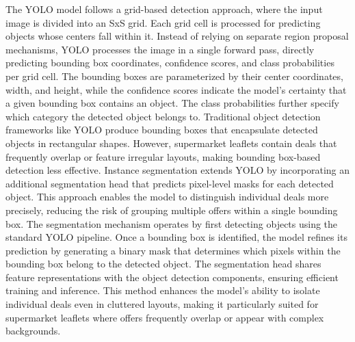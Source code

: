 \documentclass[11pt]{article}
\begin{document}
The YOLO model follows a grid-based detection approach, where the input image is divided into an SxS grid. Each grid cell is processed for predicting objects whose centers fall within it. Instead of relying on separate region proposal mechanisms, YOLO processes the image in a single forward pass, directly predicting bounding box coordinates, confidence scores, and class probabilities per grid cell. The bounding boxes are parameterized by their center coordinates, width, and height, while the confidence scores indicate the model’s certainty that a given bounding box contains an object. The class probabilities further specify which category the detected object belongs to. Traditional object detection frameworks like YOLO produce bounding boxes that encapsulate detected objects in rectangular shapes. However, supermarket leaflets contain deals that frequently overlap or feature irregular layouts, making bounding box-based detection less effective. Instance segmentation extends YOLO by incorporating an additional segmentation head that predicts pixel-level masks for each detected object. This approach enables the model to distinguish individual deals more precisely, reducing the risk of grouping multiple offers within a single bounding box. The segmentation mechanism operates by first detecting objects using the standard YOLO pipeline. Once a bounding box is identified, the model refines its prediction by generating a binary mask that determines which pixels within the bounding box belong to the detected object. The segmentation head shares feature representations with the object detection components, ensuring efficient training and inference. This method enhances the model’s ability to isolate individual deals even in cluttered layouts, making it particularly suited for supermarket leaflets where offers frequently overlap or appear with complex backgrounds.
\end{document}
